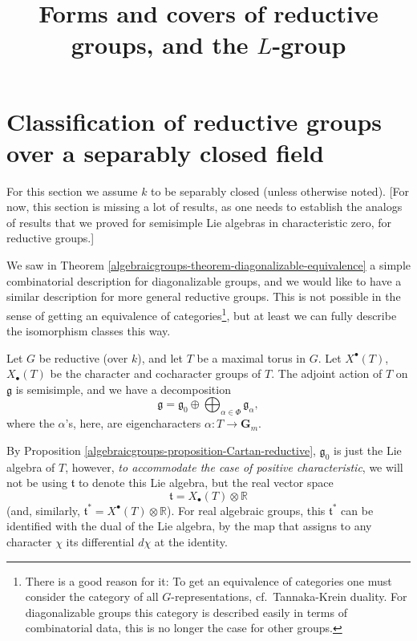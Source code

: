 

%


\title{Forms and covers of reductive groups, and the $L$-group}


\maketitle

\label{section-phantom}

\tableofcontents



\section{Classification of reductive groups over a separably closed field}
\label{section-classification-reductive}


For this section we assume $k$ to be separably closed (unless otherwise noted). [For now, this section is missing a lot of results, as one needs to establish the analogs of results that we proved for semisimple Lie algebras in characteristic zero, for reductive groups.]

We saw in Theorem \ref{algebraicgroups-theorem-diagonalizable-equivalence} a simple combinatorial description for diagonalizable groups, and we would like to have a similar description for more general reductive groups. This is not possible in the sense of getting an equivalence of categories\footnote{There is a good reason for it: To get an equivalence of categories one must consider the category of all $G$-representations, cf.\ Tannaka-Krein duality. For diagonalizable groups this category is described easily in terms of combinatorial data, this is no longer the case for other groups.}, but at least we can fully describe the isomorphism classes this way.


Let $G$ be reductive (over $k$), and let $T$ be a maximal torus in $G$. Let $X^\bullet(T)$, $X_\bullet(T)$ be the character and cocharacter groups of $T$. The adjoint action of $T$ on $\mathfrak g$ is semisimple, and we have a decomposition 
$$\mathfrak g = \mathfrak g_0 \oplus \bigoplus_{\alpha\in\Phi} \mathfrak g_\alpha,$$
where the $\alpha$'s, here, are eigencharacters $\alpha: T\to \mathbf G_m$. 

By Proposition \ref{algebraicgroups-proposition-Cartan-reductive}, $\mathfrak g_0$ is just the Lie algebra of $T$, however, \emph{to accommodate the case of positive characteristic}, we will not be using $\mathfrak t$ to denote this Lie algebra, but the real vector space
$$ \mathfrak t = X_\bullet(T)\otimes \mathbb R$$
(and, similarly, $\mathfrak t^*= X^\bullet(T)\otimes \mathbb R$). For real algebraic groups, this $\mathfrak t^*$ can be identified with the dual of the Lie algebra,  by the map that assigns to any character $\chi$ its differential $d\chi$ at the identity. 

